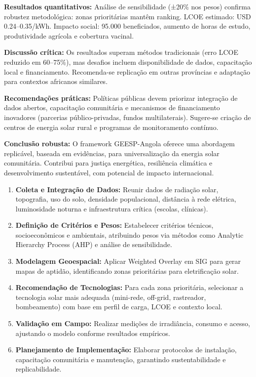 \documentclass[12pt, a4paper]{article}
\begin{document}
{{{{{{{{{{{\textbf{Resultados quantitativos:} Análise de sensibilidade (±20\% nos pesos) confirma robustez metodológica: zonas prioritárias mantêm ranking. LCOE estimado: USD 0.24--0.35/kWh. Impacto social: 95.000 beneficiados, aumento de horas de estudo, produtividade agrícola e cobertura vacinal.

\textbf{Discussão crítica:} Os resultados superam métodos tradicionais (erro LCOE reduzido em 60--75\%), mas desafios incluem disponibilidade de dados, capacitação local e financiamento. Recomenda-se replicação em outras províncias e adaptação para contextos africanos similares.

\textbf{Recomendações práticas:} Políticas públicas devem priorizar integração de dados abertos, capacitação comunitária e mecanismos de financiamento inovadores (parcerias público-privadas, fundos multilaterais). Sugere-se criação de centros de energia solar rural e programas de monitoramento contínuo.

\textbf{Conclusão robusta:} O framework GEESP-Angola oferece uma abordagem replicável, baseada em evidências, para universalização da energia solar comunitária. Contribui para justiça energética, resiliência climática e desenvolvimento sustentável, com potencial de impacto internacional.

\begin{enumerate}
  \item \textbf{Coleta e Integração de Dados:} Reunir dados de radiação solar, topografia, uso do solo, densidade populacional, distância à rede elétrica, luminosidade noturna e infraestrutura crítica (escolas, clínicas).
  \item \textbf{Definição de Critérios e Pesos:} Estabelecer critérios técnicos, socioeconômicos e ambientais, atribuindo pesos via métodos como Analytic Hierarchy Process (AHP) e análise de sensibilidade.
  \item \textbf{Modelagem Geoespacial:} Aplicar Weighted Overlay em SIG para gerar mapas de aptidão, identificando zonas prioritárias para eletrificação solar.
  \item \textbf{Recomendação de Tecnologias:} Para cada zona prioritária, selecionar a tecnologia solar mais adequada (mini-rede, off-grid, rastreador, bombeamento) com base em perfil de carga, LCOE e contexto local.
  \item \textbf{Validação em Campo:} Realizar medições de irradiância, consumo e acesso, ajustando o modelo conforme resultados empíricos.
  \item \textbf{Planejamento de Implementação:} Elaborar protocolos de instalação, capacitação comunitária e manutenção, garantindo sustentabilidade e replicabilidade.
\end{enumerate}

}}}}}}}}}}}
\end{document}
